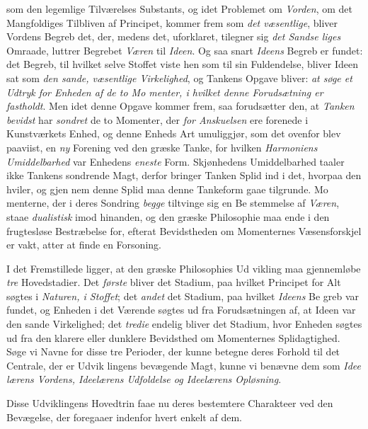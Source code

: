 som den legemlige Tilværelses Substants, og idet Problemet
om \emph{Vorden}, om det Mangfoldiges Tilbliven af Principet,
kommer frem som \emph{det væsentlige}, bliver Vordens Begreb
det, der, medens det, uforklaret, tilegner sig \emph{det Sandse\-%
liges} Omraade, luttrer Begrebet \emph{Væren} til \emph{Ideen}. Og saa\-%
snart \emph{Ideens} Begreb er fundet: det Begreb, til hvilket selve
Stoffet viste hen som til sin Fuldendelse, bliver Ideen sat som
\emph{den sande, væsentlige Virkelighed}, og Tankens Opgave
bliver: \emph{at søge et Udtryk for Enheden af de to Mo\-%
menter, i hvilket denne Forudsætning er fastholdt}.
Men idet denne Opgave kommer frem, saa forudsætter den, at
\emph{Tanken bevidst} har \emph{sondret} de to Momenter, der \emph{for
Anskuelsen} ere forenede i Kunstværkets Enhed, og denne
Enheds Art umuliggjør, som det ovenfor blev paaviist, en \emph{ny}
Forening ved den græske Tanke, for hvilken \emph{Harmoniens
Umiddelbarhed} var Enhedens \emph{eneste} Form. Skjønhedens
Umiddelbarhed taaler ikke Tankens sondrende Magt, derfor
bringer Tanken Splid ind i det, hvorpaa den hviler, og gjen\-%
nem denne Splid maa denne Tankeform gaae tilgrunde. Mo\-%
menterne, der i deres Sondring \emph{begge} tiltvinge sig en Be\-%
stemmelse af \emph{Væren}, staae \emph{dualistisk} imod hinanden, og
den græske Philosophie maa ende i den frugtesløse Bestræbelse
for, efterat Bevidstheden om Momenternes Væsensforskjel er
vakt, atter at finde en Forsoning.

I det Fremstillede ligger, at den græske Philosophies Ud\-%
vikling maa gjennemløbe \emph{tre} Hovedstadier. Det \emph{første} bliver
det Stadium, paa hvilket Principet for Alt søgtes i \emph{Naturen,
i Stoffet}; det \emph{andet} det Stadium, paa hvilket \emph{Ideens} Be\-%
greb var fundet, og Enheden i det Værende søgtes ud fra
Forudsætningen af, at Ideen var den sande Virkelighed; det
\emph{tredie} endelig bliver det Stadium, hvor Enheden søgtes ud
 \setcounter{footnote}{0}
fra den klarere eller dunklere Bevidsthed om Momenternes
Splidagtighed. Søge vi Navne for disse tre Perioder, der
kunne betegne deres Forhold til det Centrale, der er Udvik\-%
lingens bevægende Magt, kunne vi benævne dem som \emph{Idee\-%
lærens Vordens, Ideelærens Udfoldelse og Ideelærens
Opløsning}.

Disse Udviklingens Hovedtrin faae nu deres bestemtere
Charakteer ved den Bevægelse, der foregaaer indenfor hvert
enkelt af dem.

